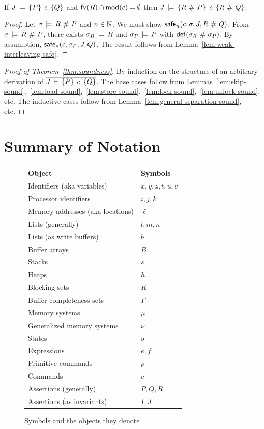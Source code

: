 \documentclass[11pt]{report}
\begin{document}
\begin{lemma}
  \label{lem:general-separation-sound}
	If $J\,\models\,\left\lbrace P \right\rbrace\;c\;\left\lbrace Q \right\rbrace$ and $\mathrm{fv}(R) \cap \mathrm{mod}(c) = \operatorname{\emptyset}$ then $J\,\models\,\left\lbrace R \operatorname{\,\#\,} P \right\rbrace\;c\;\left\lbrace R \operatorname{\,\#\,} Q \right\rbrace$. 
\end{lemma}

\begin{proof}
	Let $\sigma \,\models\, R \operatorname{\,\#\,} P$ and $n \in \mathbb{N}$. We must show $\mathsf{safe}_{n}(c,\sigma,J,R\operatorname{\,\#\,} Q)$. From $\sigma \,\models\, R \operatorname{\,\#\,} P$, there exists $\sigma_R \,\models\, R$ and $\sigma_P \,\models\, P$ with $\mathsf{def}(\sigma_R \operatorname{\,\#\,} \sigma_P)$. By assumption, $\mathsf{safe}_{n}(c,\sigma_P,J,Q)$. The result follows from Lemma~\ref{lem:weak-interleaving-safe}. 
\end{proof}

\begin{proof}[Proof of Theorem~\ref{thm:soundness}]

By induction on the structure of an arbitrary derivation of $\overline{J\,\vdash\,\left\lbrace P \right\rbrace\;c\;\left\lbrace Q \right\rbrace}$. The base cases follow from Lemmas~\ref{lem:skip-sound},~\ref{lem:load-sound},~\ref{lem:store-sound},~\ref{lem:lock-sound},~\ref{lem:unlock-sound}, etc. The inductive cases follow from Lemma~\ref{lem:general-separation-sound}, etc. 

\end{proof}

\section{Summary of Notation}

\begin{figure}
\centering
\begin{tabular}{l|l}
Object & Symbols \\  
\hline 
Identifiers (aka variables) & $x,y,z,t,u,v$ \\
Processor identifiers & $i,j,k$ \\ 
Memory addresses (aka locations) & $\ell$ \\ 
Lists (generally) & $l,m,n$ \\ 
Lists (as write buffers) & $b$ \\ 
Buffer arrays & $B$ \\ 
Stacks & $s$ \\ 
Heaps & $h$ \\ 
Blocking sets & $K$ \\ 
Buffer-completeness sets & $\Gamma$ \\ 
Memory systems & $\mu$ \\ 
Generalized memory systems & $\nu$ \\ 
States & $\sigma$ \\ 
Expressions & $e,f$ \\ 
Primitive commands & $p$ \\
Commands & $c$ \\ 
Assertions (generally) & $P,Q,R$ \\
Assertions (as invariants) & $I,J$ \\
\end{tabular}
\caption{Symbols and the objects they denote\label{fig:objects-and-symbols}}
\end{figure}
\end{document}
